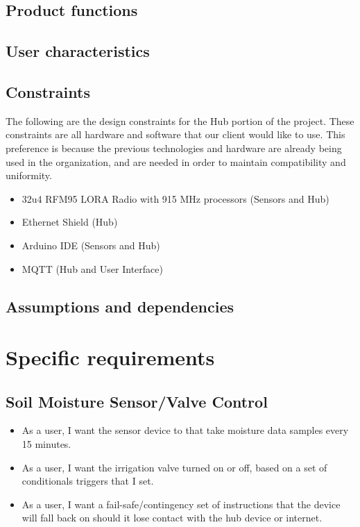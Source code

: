 \documentclass[onecolumn, draftclsnofoot,10pt, compsoc]{IEEEtran}
\begin{document}
	\subsection{Product functions}
	\subsection{User characteristics}
	\subsection{Constraints}
	The following are the design constraints for the Hub portion of the project.
	These constraints are all hardware and software that our client would like to use.
	This preference is because the previous technologies and hardware are already being used in the organization, and are needed in order to maintain compatibility and uniformity.
	\begin{itemize}
		\item{32u4 RFM95 LORA Radio with 915 MHz processors (Sensors and Hub)}
		\item{Ethernet Shield (Hub)}
		\item{Arduino IDE (Sensors and Hub)}
		\item{MQTT (Hub and User Interface)}
	\end{itemize}
	\subsection{Assumptions and dependencies}
	\section{Specific requirements}
	\subsection{Soil Moisture Sensor/Valve Control}
	\begin{itemize}
		\item{As a user, I want the sensor device to that take moisture data samples every 15 minutes.}
		\item{As a user, I want the irrigation valve turned on or off, based on a set of conditionals triggers that I set.}
		\item{As a user, I want a fail-safe/contingency set of instructions that the device will fall back on should it lose contact with the hub device or internet.}
	\end{itemize}
	
\end{document}
